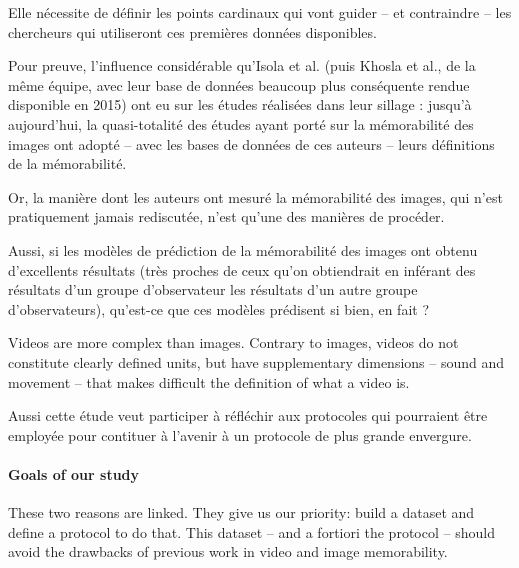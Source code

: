 \documentclass[sigconf]{acmart}
\begin{document}
Elle nécessite de définir les points cardinaux qui vont guider – et contraindre – les chercheurs qui utiliseront ces premières données disponibles.

Pour preuve, l'influence considérable qu'Isola et al. (puis Khosla et al., de la même équipe, avec leur base de données beaucoup plus conséquente rendue disponible en 2015) ont eu sur les études réalisées dans leur sillage : jusqu'à aujourd'hui, la quasi-totalité des études ayant porté sur la mémorabilité des images ont adopté – avec les bases de données de ces auteurs – leurs définitions de la mémorabilité.

Or, la manière dont les auteurs ont mesuré la mémorabilité des images, qui n'est pratiquement jamais rediscutée, n'est qu'une des manières de procéder.

Aussi, si les modèles de prédiction de la mémorabilité des images ont obtenu d'excellents résultats (très proches de ceux qu'on obtiendrait en inférant des résultats d'un groupe d'observateur les résultats d'un autre groupe d'observateurs), qu'est-ce que ces modèles prédisent si bien, en fait ? 

	Videos are more complex than images. Contrary to images, videos do not constitute clearly defined units, but have supplementary dimensions -- sound and movement -- that makes difficult the definition of what a video is.


Aussi cette étude veut participer à réfléchir aux protocoles qui pourraient être employée pour contituer à l'avenir à un protocole de plus grande envergure.




\paragraph{Goals of our study}
These two reasons are linked. They give us our priority: build a dataset and define a protocol to do that.
This dataset -- and a fortiori the protocol -- should avoid the drawbacks of previous work in video and image memorability.
\end{document}
